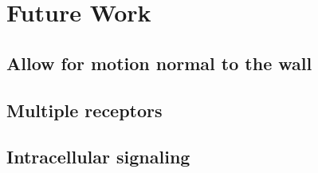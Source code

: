 
\chapter{Future Work}

\section{Allow for motion normal to the wall}
\label{sec:allow-motion-normal}

\section{Multiple receptors}
\label{sec:multiple-receptors}

\section{Intracellular signaling}
\label{sec:intr-sign}


